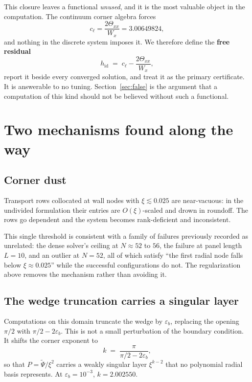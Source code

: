 \documentclass[11pt]{article}
\newcommand{\hid}{h_{\mathrm{id}}}
\begin{document}
This closure leaves a functional \emph{unused}, and it is the most valuable object in
the computation. The continuum corner algebra forces
\[
  c_\ell = \frac{2\Theta_{xx}}{W_x} = 3.00649824,
\]
and nothing in the discrete system imposes it. We therefore define the \textbf{free
residual}
\[
  \hid \;=\; c_\ell - \frac{2\Theta_{xx}}{W_x},
\]
report it beside every converged solution, and treat it as the primary certificate. It
is answerable to no tuning. Section~\ref{sec:false} is the argument that a computation
of this kind should not be believed without such a functional.

\section{Two mechanisms found along the way}
\label{sec:mechanisms}

\subsection{Corner dust}
\label{sec:dust}

Transport rows collocated at wall nodes with $\xi \lesssim 0.025$ are near-vacuous: in
the undivided formulation their entries are $O(\xi)$-scaled and drown in roundoff. The
rows go dependent and the system becomes rank-deficient and inconsistent.

This single threshold is consistent with a family of failures previously recorded as
unrelated: the dense solver's ceiling at $N \approx 52$ to $56$, the failure at panel
length $L = 10$, and an outlier at $N = 52$, all of which satisfy ``the first radial
node falls below $\xi \approx 0.025$'' while the successful configurations do not. The
regularization above removes the mechanism rather than avoiding it.

\subsection{The wedge truncation carries a singular layer}
\label{sec:layer}

Computations on this domain truncate the wedge by $\varepsilon_b$, replacing the opening
$\pi/2$ with $\pi/2 - 2\varepsilon_b$. This is not a small perturbation of the boundary
condition. It shifts the corner exponent to
\[
  k \;=\; \frac{\pi}{\pi/2 - 2\varepsilon_b},
\]
so that $P = \tilde\Psi/\xi^2$ carries a weakly singular layer $\xi^{k-2}$ that no
polynomial radial basis represents. At $\varepsilon_b = 10^{-3}$, $k = 2.002550$.
\end{document}
